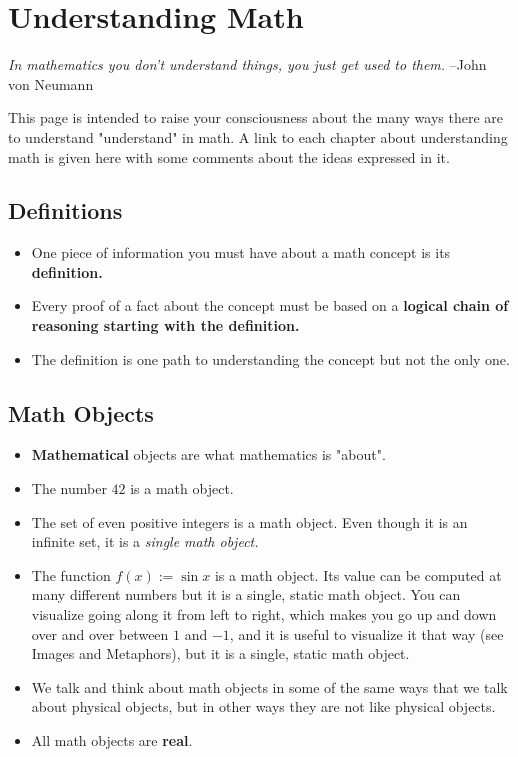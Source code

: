 \section{Understanding Math}
    \textit{In mathematics you don’t understand things, you just get used to them.}
    –John von Neumann

    This page is intended to raise your consciousness about the many ways there are
    to understand "understand" in math. A link to each chapter about understanding
    math is given here with some comments about the ideas expressed in it.

    \subsection{Definitions}
        \begin{itemize}
            \item{One piece of information you must have about a math concept is its \textbf{definition.}}

            \item{Every proof of a fact about the concept must be based on a
                \textbf{logical chain of reasoning starting with the definition.}}

            \item{The definition is one path to understanding the concept but not the only one.}
        \end{itemize}

    \subsection{Math Objects}
        \begin{itemize}
            \item{\textbf{Mathematical} objects are what mathematics is "about".}

            \item{The number $42$ is a math object.}

            \item{The set of even positive integers is a math object.
                  Even though it is an infinite set, it is a \textit{single math object.}}

            \item{The function $f(x):={{\sin }}x$ is a math object. Its value can be
                  computed at many different numbers but it is a single, static
                  math object. You can visualize going along it from left to right,
                  which makes you go up and down over and over between $1$ and $-1$, and it
                  is useful to visualize it that way (see Images and Metaphors), but it is a
                  single, static math object.}

            \item{We talk and think about math objects in some of the same ways
                  that we talk about physical objects, but in other ways they are
                  not like physical objects.}

            \item{All math objects are \textbf{real}.}
        \end{itemize}

